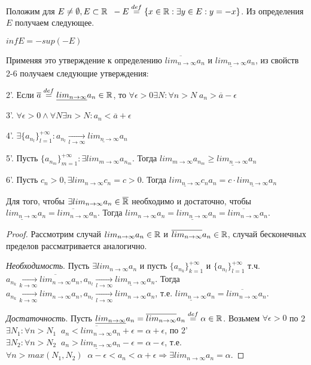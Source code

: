 \documentclass[main]{subfiles}
\begin{document}
Положим для $E \neq \emptyset, E \subset \mathbb{R} \;\; -E \overset{def}{=} \{
x \in \mathbb{R} : \exists y \in E : y = -x\}$. Из определения $E$ получаем следующее.

\begin{assertion}
    $infE = -sup(-E)$
\end{assertion}

Применяя это утверждение к определению $\overline{lim_{n\to\infty}}a_n$ и
$\underline{lim_{n\to\infty}}a_n$, из свойств 2-6 получаем следующие утверждения:
\begin{assertion}
    \item 2'. Если $\overline{a} \overset{def}{=} \underline{lim_{n\to\infty}}a_n
\in \mathbb{R}$, то $\forall \epsilon > 0 \exists N : \forall n > N \; a_n > 
\overline{a} - \epsilon$
    \item 3'. $\forall \epsilon > 0 \wedge \forall N \exists n > N : a_n < 
\overline{a} + \epsilon$
    \item 4'. $\exists \{a_{n_l}\}_{l=1}^{+\infty} : a_{n_l} 
\underset{l\to\infty}{\to} \underline{lim_{n\to\infty}}a_n$
    \item 5'. Пусть $\{a_{n_m}\}_{m=1}^{+\infty} : \exists lim_{m\to\infty}a_{n_m}$.
Тогда $lim_{m\to\infty}a_{n_m} \geq \underline{lim_{n\to\infty}}a_n$
    \item 6'. Пусть $c_n > 0, \exists lim_{n\to\infty}c_n = c > 0$. Тогда 
$\underline{lim_{n\to\infty}}c_na_n = c \cdot \underline{lim_{n\to\infty}}a_n$
    \item Для того, чтобы $\exists lim_{n\to\infty}a_n \in \overline{\mathbb{R}}$
необходимо и достаточно, чтобы $\underline{lim_{n\to\infty}}a_n =
\overline{lim_{n\to\infty}}a_n$. Тогда $lim_{n\to\infty}a_n = 
\underline{lim_{n\to\infty}}a_n = \overline{lim_{n\to\infty}}a_n$.
\end{assertion}
\begin{proof}
    Рассмотрим случай $lim_{n\to\infty}a_n \in \mathbb{R}$ и 
    $\overline{lim_{n\to\infty}}a_n \in \mathbb{R}$, случай бесконечных пределов 
    рассматривается аналогично.

    \emph{Необходимость}. Пусть $\exists lim_{n\to\infty}a_n$ и пусть 
    $\{a_{n_k}\}_{k=1}^{+\infty}$ и $\{a_{n_l}\}_{l=1}^{+\infty}$ т.ч. 
    $a_{n_k} \underset{k\to\infty}{\to} \overline{lim_{n\to\infty}}a_n, 
    a_{n_l} \underset{l\to\infty}{\to} \underline{lim_{n\to\infty}}a_n$. Тогда
    $a_{n_k} \underset{k\to\infty}{\to} {lim_{n\to\infty}}a_n, 
    a_{n_l} \underset{l\to\infty}{\to} {lim_{n\to\infty}}a_n$, т.е. 
    $\underline{lim_{n\to\infty}}a_n = \overline{lim_{n\to\infty}}a_n$.

    \emph{Достаточность}. Пусть $\underline{lim_{n\to\infty}}a_n = 
    \overline{lim_{n\to\infty}}a_n \overset{def}{=} \alpha \in \mathbb{R}$. 
    Возьмем $\forall \epsilon > 0$ по 2 $\exists N_1 : \forall n > N_1 \;\;
    a_n <  \overline{lim_{n\to\infty}}a_n + \epsilon = \alpha + \epsilon$, 
    по 2' $\exists N_2 : \forall n > N_2 \;\; a_n > \underline{lim_{n\to\infty}}a_n -
    \epsilon = \alpha - \epsilon$, т.е. $\forall n > max(N_1, N_2) \;\; 
    \alpha - \epsilon < a_n < \alpha + \epsilon \Rightarrow \exists 
    lim_{n\to\infty}a_n = \alpha$.
\end{proof}
\end{document}
